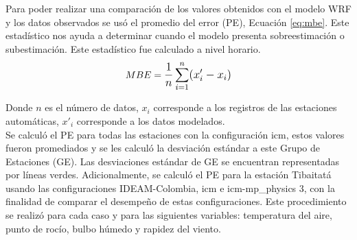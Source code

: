 Para poder realizar una comparación de los valores obtenidos con el modelo WRF y los datos observados se usó el promedio del error (PE), Ecuación \ref{eq:mbe}. Este estadístico nos ayuda a determinar cuando el modelo presenta sobreestimación o subestimación. Este estadístico fue calculado a nivel horario.\\

\begin{equation}\label{eq:mbe}
MBE = \mathlarger{\frac{1}{n} \sum_{i=1}^n (x'_i - x_i)}
\end{equation}

Donde $n$ es el número de datos, $x_i$ corresponde a los registros de las estaciones automáticas, $x'_i$ corresponde a los datos modelados.\\


Se calculó el PE para todas las estaciones con la configuración icm, estos valores fueron promediados y se les calculó la desviación estándar a este Grupo de Estaciones (GE). Las desviaciones estándar de GE se encuentran representadas por líneas verdes. Adicionalmente, se calculó el PE para la estación Tibaitatá usando las configuraciones IDEAM-Colombia, icm e icm-mp\_physics 3, con la finalidad de comparar el desempeño de estas configuraciones. Este procedimiento se realizó para cada caso y  para las siguientes variables: temperatura del aire, punto de rocío, bulbo húmedo y rapidez del viento.\\





